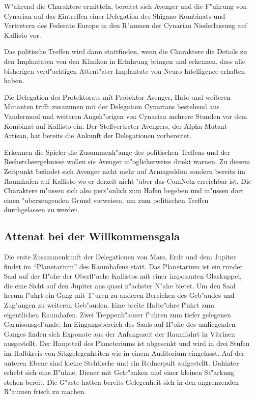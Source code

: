 W"ahrend die Charaktere ermitteln, bereitet sich Avenger und die F"uhrung von Cynarian auf das Eintreffen einer Delegation des Shigano-Kombinats und Vertretern des Federate Europe in den R"aumen der Cynarian Niederlassung auf Kallisto vor.

Das politische Treffen wird dann stattfinden, wenn die Charaktere die Details zu den Implantaten von den Kliniken in
Erfahrung bringen und erkennen, dass alle bisherigen verd"achtigen Attent"ater Implantate von Neuro Intelligence
erhalten haben.

Die Delegation des Protektorats mit Protektor Avenger, Hato und weiteren Mutanten trifft zusammen mit der Delegation Cynarians bestehend aus Vandermool und weiteren Angeh"origen von Cynarian mehrere Stunden vor dem Kombinat auf Kallisto
ein. Der Stellvertreter Avengers, der Alpha Mutant Artisan, hat bereits die Ankunft der Delegationen vorbereitet.

\begin{remarks}
	Erkennen die Spieler die Zusammenh"ange des politischen Treffens und der Rechercheergebnisse wollen sie Avenger m"oglicherweise direkt warnen. Zu diesem Zeitpunkt befindet sich Avenger nicht mehr auf Armageddon sondern bereits im Raumhafen auf Kallisto wo er derzeit nicht "uber das ComNetz erreichbar ist. Die Charaktere m"ussen sich also pers"onlich zum Hafen begeben und m"ussen dort einen "uberzeugenden Grund vorweisen, um zum politischen Treffen durchgelassen zu werden.
\end{remarks}

\subsection{Attenat bei der Willkommensgala}

Die erste Zusammenkunft der Delegationen von Mars, Erde und dem Jupiter findet im "`Planetarium"' des Raumhafens statt. Das Planetarium ist ein runder Saal auf der H"ohe der Oberfl"ache Kallistos mit einer imposanten Glaskuppel, die eine Sicht auf den Jupiter aus quasi n"achster N"ahe bietet. Um den Saal herum f"uhrt ein Gang mit T"uren zu anderen Bereichen des Geb"audes und Zug"angen zu weiteren Geb"auden. Eine breite Halbr"ohre f"uhrt zum eigentlichen Raumhafen. Zwei Treppenh"auser f"uhren zum tiefer gelegenen Garnisonsgel"ande. Im Eingangsbereich des Saals auf H"ohe des umliegenden Ganges finden sich Exponate aus der Anfangszeit der Raumfahrt in Vitrinen ausgestellt. Der Hauptteil des Planeteriums ist abgesenkt und wird in drei Stufen im Halbkreis von Sitzgelegenheiten wie in einem Auditorium eingefasst. Auf der unteren Ebene sind kleine Stehtische und ein Rednerpult aufgestellt. Dahinter erhebt sich eine B"uhne. Diener mit Getr"anken und einer kleinen St"arkung stehen bereit. Die G"aste hatten bereits Gelegenheit sich in den angrenzenden R"aumen frisch zu machen.

